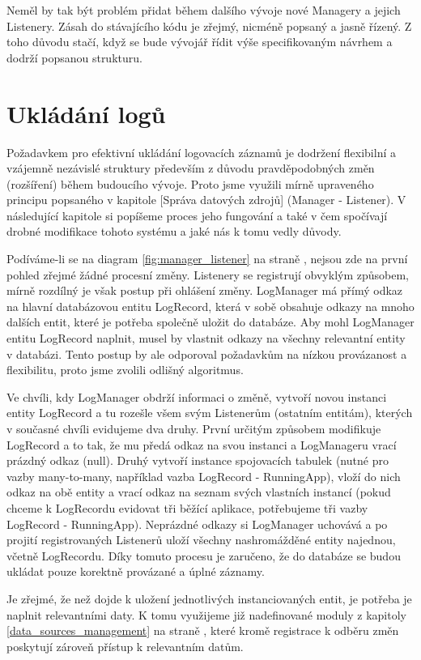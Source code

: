 \documentclass[thesis=M,czech]{FITthesis}[2012/06/26]
\begin{document}
Neměl by tak být problém přidat během dalšího vývoje nové Managery a jejich Listenery. Zásah do stávajícího kódu je zřejmý, nicméně popsaný a jasně řízený. Z toho důvodu stačí, když se bude vývojář řídit výše specifikovaným návrhem a dodrží popsanou strukturu.

\section{Ukládání logů}
Požadavkem pro efektivní ukládání logovacích záznamů je dodržení flexibilní a vzájemně nezávislé struktury především z důvodu pravděpodobných změn (rozšíření) během budoucího vývoje. Proto jsme využili mírně upraveného principu popsaného v kapitole [Správa datových zdrojů] (Manager - Listener). V následující kapitole si popíšeme proces jeho fungování a také v čem spočívají drobné modifikace tohoto systému a jaké nás k tomu vedly důvody.

Podíváme-li se na diagram \ref{fig:manager_listener} na straně \pageref{fig:manager_listener}, nejsou zde na první pohled zřejmé žádné procesní změny. Listenery se registrují obvyklým způsobem, mírně rozdílný je však postup při ohlášení změny. LogManager má přímý odkaz na hlavní databázovou entitu LogRecord, která v sobě obsahuje odkazy na mnoho dalších entit, které je potřeba společně uložit do databáze. Aby mohl LogManager entitu LogRecord naplnit, musel by vlastnit odkazy na všechny relevantní entity v databázi. Tento postup by ale odporoval požadavkům na nízkou provázanost a flexibilitu, proto jsme zvolili odlišný algoritmus.

Ve chvíli, kdy LogManager obdrží informaci o změně, vytvoří novou instanci entity LogRecord a tu rozešle všem svým Listenerům (ostatním entitám), kterých v současné chvíli evidujeme dva druhy. První určitým způsobem modifikuje LogRecord a to tak, že mu předá odkaz na svou instanci a LogManageru vrací prázdný odkaz (null). Druhý vytvoří instance spojovacích tabulek (nutné pro vazby many-to-many, například vazba LogRecord - RunningApp), vloží do nich odkaz na obě entity a vrací odkaz na seznam svých vlastních instancí (pokud chceme k LogRecordu evidovat tři běžící aplikace, potřebujeme tři vazby LogRecord - RunningApp). Neprázdné odkazy si LogManager uchovává a po projití registrovaných Listenerů uloží všechny nashromážděné entity najednou, včetně LogRecordu. Díky tomuto procesu je zaručeno, že do databáze se budou ukládat pouze korektně provázané a úplné záznamy.

Je zřejmé, že než dojde k uložení jednotlivých instanciovaných entit, je potřeba je naplnit relevantními daty. K tomu využijeme již nadefinované moduly z kapitoly \ref{data_sources_management} na straně \pageref{data_sources_management}, které kromě registrace k odběru změn poskytují zároveň přístup k relevantním datům.
\end{document}
